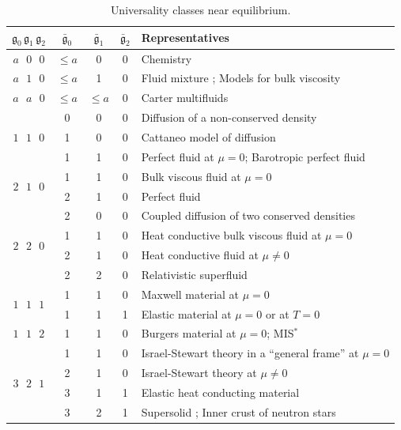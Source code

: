 \documentclass[aps,prl,singlecolumn,nofootinbib]{revtex4-2}
\theoremstyle{definition}
\theoremstyle{theorem}
\begin{document}
\begin{table}[h!]
\centering
\begin{tabular}{ | c |c c c| l| }
\hline
$\mathfrak{g}_0  \, \mathfrak{g}_1 \, \mathfrak{g}_2 $&$\bar{\mathfrak{g}}_0$ & $\bar{\mathfrak{g}}_1$ & $\bar{\mathfrak{g}}_2$ & Representatives \\
 \hline
 \hline
  $a \, \, \, \, 0 \, \,  \,\, 0$ & $\leq a$ & 0 & 0 & Chemistry \\ 
 \hline
  $a \, \, \, \, 1 \, \,  \,\, 0$ & $\leq a$ & 1 & 0 & Fluid mixture \cite{noto_rel,BulkGavassino}; Models for bulk viscosity \cite{Causality_bulk} \\ 
 \hline
$a \, \, \, \, a \, \,  \,\, 0$ &  $\leq a$ & $ \leq a$ & 0 & Carter multifluids \cite{Carter_starting_point,GavassinoStabilityCarter2022} \\ 
 \hline
  \multirow{3}{3em}{ $1 \, \, \, \, 1 \, \,  \,\, 0$ }  & 0 & 0 & 0 & Diffusion of a non-conserved density \\ 
    & 1 & 0 & 0 & Cattaneo model of diffusion \cite{cattaneo1958,Jou_Extended} \\ 
      & 1 & 1 & 0 & Perfect fluid at $\mu=0$; Barotropic perfect fluid \\ 
 \hline
  \multirow{2}{3em}{ $2 \, \, \, \, 1 \, \,  \,\, 0$ }  & 1 & 1 & 0 & Bulk viscous fluid at $\mu=0$ \\ 
      & 2 & 1 & 0 & Perfect fluid  \\ 
\hline
  \multirow{4}{3em}{ $2 \, \, \, \, 2 \, \,  \,\, 0$ } & 2 & 0 & 0 & Coupled diffusion of two conserved densities \cite{Onsager1931} \\ 
  & 1 & 1 & 0 & Heat conductive bulk viscous fluid at $\mu=0$ \\ 
    & 2 & 1 & 0 & Heat conductive fluid at $\mu \neq 0$ \cite{OlsonRegularCarter1990} \\ 
      & 2 & 2 & 0 & Relativistic superfluid \cite{cool1995} \\ 
 \hline
   \multirow{2}{3em}{ $1 \, \, \, \, 1 \, \,  \,\, 1$ }  & 1 & 1 & 0 & Maxwell material \cite{BaggioliHolography,GavassinoGENERIC2022} at $\mu=0$ \\ 
      & 1 & 1 & 1 & Elastic material at $\mu=0$ or at $T=0$ \cite{Schumaker1983,landau7}   \\ 
 \hline
$1 \, \, \, \, 1 \, \,  \,\, 2$ &  1 & 1 & 0 & Burgers material \cite{Malek2018} at $\mu=0$; MIS$^*$ \cite{KeYin2022} \\ 
 \hline
\multirow{4}{3em}{$3 \, \, \, \, 2 \, \,  \,\, 1$} &  1 & 1 & 0 & Israel-Stewart theory in a ``general frame'' \cite{NoronhaGeneralFrame2021} at $\mu = 0$  \\ 
&  2 & 1 & 0 & Israel-Stewart theory \cite{Israel_Stewart_1979,Hishcock1983}  at $\mu \neq 0$ \\ 
&  3 & 1 & 1 & Elastic heat conducting material  \\ 
&  3 & 2 & 1 & Supersolid \cite{Andreev1969,Sears2010}; Inner crust of neutron stars \cite{CarterSamuelsson2006}  \\ 
 \hline
\end{tabular}
\caption{Universality classes near equilibrium.}
\label{tableI}
\end{table}
\end{document}
